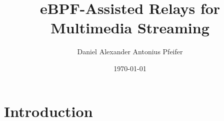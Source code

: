 \documentclass[shortpres,aspectratio=43]{beamer}
\title[eBPF-Assisted Relay Setup]{eBPF-Assisted Relays for Multimedia Streaming}
\author[Daniel Pfeifer]{Daniel Alexander Antonius Pfeifer}
\institute[TU M\"unchen]{Technical University of Munich}
\date\today
\begin{document}


\begin{frame}[plain]
    \titlepage%
\end{frame}

\begin{frame}{}
  \tableofcontents
\end{frame}

\section{Introduction}

\begin{frame}{}
  \tableofcontents[currentsection]
\end{frame}
\end{document}
